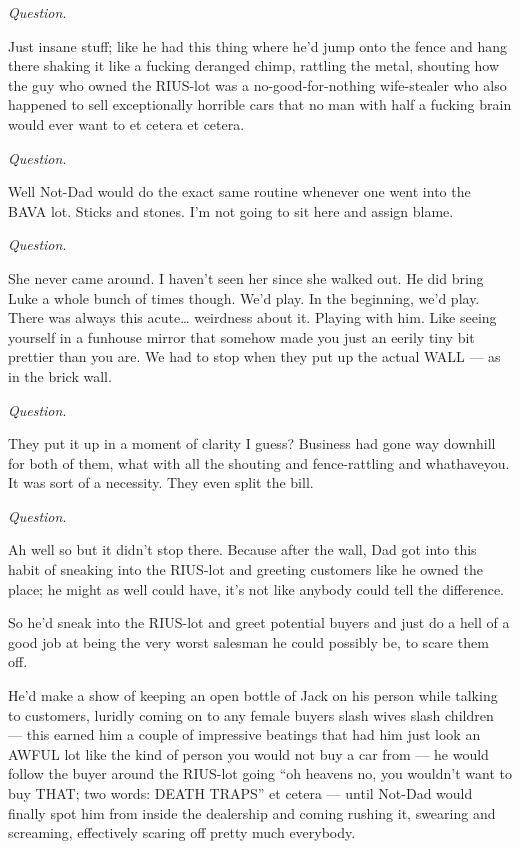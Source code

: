 {\em Question}.



Just insane stuff; like he had this thing where he'd jump
onto the fence and hang there shaking it like a fucking deranged
chimp, rattling the metal, shouting how the guy who owned the
RIUS-lot was a no-good-for-nothing wife-stealer who also happened
to sell exceptionally horrible cars that no man with half a fucking
brain would ever want to et cetera et cetera.



{\em Question}.



Well Not-Dad would do the exact same routine whenever one went into
the BAVA lot. Sticks and stones. I'm not going to sit here and
assign blame.



{\em Question}.



She never came around. I haven't seen her since she walked
out. He did bring Luke a whole bunch of times though. We'd
play. In the beginning, we'd play. There was always this
acute{\ldots} weirdness about it. Playing with him. Like seeing
yourself in a funhouse mirror that somehow made you just an eerily
tiny bit prettier than you are. We had to stop when they put up the
actual WALL --- as in the brick wall.



{\em Question}.



They put it up in a moment of clarity I guess? Business had gone
way downhill for both of them, what with all the shouting and
fence-rattling and whathaveyou. It was sort of a necessity. They
even split the bill.



{\em Question}.



Ah well so but it didn't stop there. Because after the wall,
Dad got into this habit of sneaking into the RIUS-lot and greeting
customers like he owned the place; he might as well could have,
it's not like anybody could tell the difference.

So he'd sneak into the RIUS-lot and greet potential buyers
and just do a hell of a good job at being the very worst salesman
he could possibly be, to scare them off.

He'd make a show of keeping an open bottle of Jack on his
person while talking to customers, luridly coming on to any female
buyers slash wives slash children --- this earned him a couple
of impressive beatings that had him just look an AWFUL lot like the
kind of person you would not buy a car from --- he would follow
the buyer around the RIUS-lot going ``oh heavens no, you
wouldn't want to buy THAT; two words: DEATH TRAPS'' et
cetera --- until Not-Dad would finally spot him from inside the
dealership and coming rushing it, swearing and screaming,
effectively scaring off pretty much everybody.

